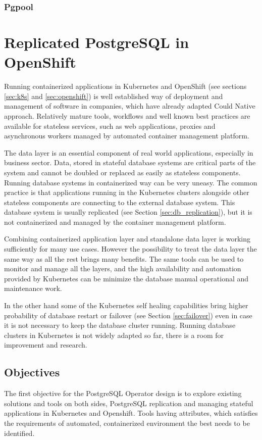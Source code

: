 \documentclass[
  digital, %
  twoside, %
  table,   %
  lof,     %
  lot,     %
]{fithesis3}
\begin{document}
\subsection{Pgpool}

\chapter{Replicated PostgreSQL in OpenShift} \label{chap:pg_in_openshift}
Running containerized applications in Kubernetes and OpenShift (see sections \ref{sec:k8s} and \ref{sec:openshift}) is well established way of deployment and management of software in companies, which have already adapted Could Native approach. Relatively mature tools, workflows and well known best practices are available for stateless services, such as web applications, proxies and asynchronous workers managed by automated container management platform.

The data layer is an essential component of real world applications, especially in business sector. Data, stored in stateful database systems are critical parts of the system and cannot be doubled or replaced as easily as stateless components. Running database systems in containerized way can be very uneasy. The common practice is that applications running in the Kubernetes clusters alongside other stateless components are connecting to the external database system. This database system is usually replicated (see Section \ref{sec:db_replication}), but it is not containerized and managed by the container management platform.

Combining containerized application layer and standalone data layer is working sufficiently for many use cases. However the possibility to treat the data layer the same way as all the rest brings many benefits. The same tools can be used to monitor and manage all the layers, and the high availability and automation provided by Kubernetes can be minimize the database manual operational and maintenance work.

In the other hand some of the Kubernetes self healing capabilities bring higher probability of database restart or failover (see Section \ref{sec:failover}) even in case it is not necessary to keep the database cluster running. Running database clusters in Kubernetes is not widely adapted so far, there is a room for improvement and research.

\section{Objectives}
The first objective for the PostgreSQL Operator design is to explore existing solutions and tools on both sides, PostgreSQL replication and managing stateful applications in Kubernetes and Openshift. Tools having attributes, which satisfies the requirements of automated, containerized environment the best needs to be identified.
\end{document}
